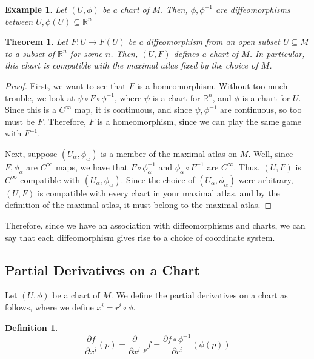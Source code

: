 \documentclass[10pt]{article}
\newtheorem{definition}{Definition}[section]
\newtheorem{theorem}{Theorem}[section]
\newtheorem{example}{Example}[section]
\begin{document}
\begin{example}
Let $(U, \phi)$ be a chart of $M$. Then, $\phi, \phi^{-1}$ are diffeomorphisms between $U, \phi(U) \subseteq \mathbb{R}^n$
\end{example}

\begin{theorem}
Let $F: U \to F(U)$ be a diffeomorphism from an open subset $U \subseteq M$ to a subset of $\mathbb{R}^n$ for some $n$. Then, $(U, F)$ defines a chart of $M$. In particular, this chart is compatible with the maximal atlas fixed by the choice of $M$. 

\end{theorem}

\begin{proof}
First, we want to see that $F$ is a homeomorphism. Without too much trouble, we look at $\psi \circ F \circ \phi^{-1}$, where $\psi$ is a chart for $\mathbb{R}^n$, and $\phi$ is a chart for $U$. Since this is a $C^\infty$ map, it is continuous, and since $\psi, \phi^{-1}$ are continuous, so too must be $F$. Therefore, $F$ is a homeomorphism, since we can play the same game with $F^{-1}$.

Next, suppose $(U_\alpha, \phi_\alpha)$ is a member of the maximal atlas on $M$. Well, since $F, \phi_\alpha$ are $C^\infty$ maps, we have that $F \circ \phi_\alpha^{-1}$ and $\phi_\alpha\circ F^{-1}$ are $C^\infty$. Thus, $(U, F)$ is $C^\infty$ compatible with $(U_\alpha, \phi_\alpha)$. Since the choice of $(U_\alpha, \phi_\alpha)$ were arbitrary, $(U,F)$ is compatible with every chart in your maximal atlas, and by the definition of the maximal atlas, it must belong to the maximal atlas.
\end{proof}

Therefore, since we have an association with diffeomorphisms and charts, we can say that each diffeomorphism gives rise to a choice of coordinate system.

\subsection{Partial Derivatives on a Chart}

Let $(U, \phi)$ be a chart of $M$. We define the partial derivatives on a chart as follows, where we define $x^i = r^i \circ \phi$.

\begin{definition}

$$ \frac{\partial f}{\partial x^i} (p) = \frac{\partial}{\partial x^i} \bigg|_p f = \frac{\partial f \circ \phi^{-1}}{\partial r^i} (\phi(p)) $$
\end{definition}
\end{document}
